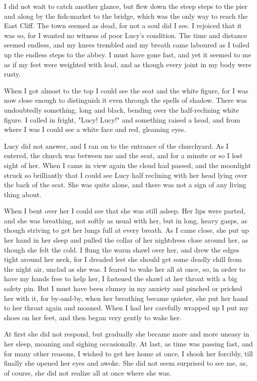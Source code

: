 I did not wait to catch another glance, but flew down the steep steps to the pier and along by the fish-market to the bridge, which was the only way to reach the East Cliff. The town seemed as dead, for not a soul did I see. I rejoiced that it was so, for I wanted no witness of poor Lucy's condition. The time and distance seemed endless, and my knees trembled and my breath came laboured as I toiled up the endless steps to the abbey. I must have gone fast, and yet it seemed to me as if my feet were weighted with lead, and as though every joint in my body were rusty. 

When I got almost to the top I could see the seat and the white figure, for I was now close enough to distinguish it even through the spells of shadow. There was undoubtedly something, long and black, bending over the half-reclining white figure. I called in fright, "Lucy! Lucy!" and something raised a head, and from where I was I could see a white face and red, gleaming eyes. 

Lucy did not answer, and I ran on to the entrance of the churchyard. As I entered, the church was between me and the seat, and for a minute or so I lost sight of her. When I came in view again the cloud had passed, and the moonlight struck so brilliantly that I could see Lucy half reclining with her head lying over the back of the seat. She was quite alone, and there was not a sign of any living thing about. 

When I bent over her I could see that she was still asleep. Her lips were parted, and she was breathing, not softly as usual with her, but in long, heavy gasps, as though striving to get her lungs full at every breath. As I came close, she put up her hand in her sleep and pulled the collar of her nightdress close around her, as though she felt the cold. I flung the warm shawl over her, and drew the edges tight around her neck, for I dreaded lest she should get some deadly chill from the night air, unclad as she was. I feared to wake her all at once, so, in order to have my hands free to help her, I fastened the shawl at her throat with a big safety pin. But I must have been clumsy in my anxiety and pinched or pricked her with it, for by-and-by, when her breathing became quieter, she put her hand to her throat again and moaned. When I had her carefully wrapped up I put my shoes on her feet, and then began very gently to wake her. 

At first she did not respond, but gradually she became more and more uneasy in her sleep, moaning and sighing occasionally. At last, as time was passing fast, and for many other reasons, I wished to get her home at once, I shook her forcibly, till finally she opened her eyes and awoke. She did not seem surprised to see me, as, of course, she did not realize all at once where she was. 

